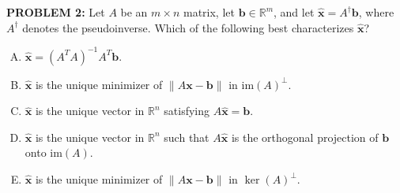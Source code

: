 \documentclass[12pt]{amsart}
\newcommand{\norm}[1]{\|#1\|}
\begin{document}
{\bf PROBLEM 2:}
%
Let $A$ be an $m \times n$ matrix, let $\mathbf{b} \in \mathbb{R}^m$, and
let $\hat{\mathbf{x}} = A^\dagger \mathbf{b}$, where $A^\dagger$ denotes
the pseudoinverse.  Which of the following best characterizes
$\hat{\mathbf{x}}$?
%
\begin{enumerate}[(A)]
\item $\hat{\mathbf{x}} = (A^T A)^{-1} A^T \mathbf{b}$.
\item $\hat{\mathbf{x}}$ is the unique minimizer of $\norm{A\mathbf{x} - \mathbf{b}}$ in $\mathrm{im}(A)^\perp$.
\item $\hat{\mathbf{x}}$ is the unique vector in $\mathbb{R}^n$ satisfying $A\hat{\mathbf{x}} = \mathbf{b}$.
\item $\hat{\mathbf{x}}$ is the unique vector in $\mathbb{R}^n$ such that $A\hat{\mathbf{x}}$ is the orthogonal projection of $\mathbf{b}$ onto $\mathrm{im}(A)$.
\item $\hat{\mathbf{x}}$ is the unique minimizer of $\norm{A\mathbf{x} - \mathbf{b}}$ in $\ker(A)^\perp$.
\end{enumerate}
%
%
%
%
\end{document}
